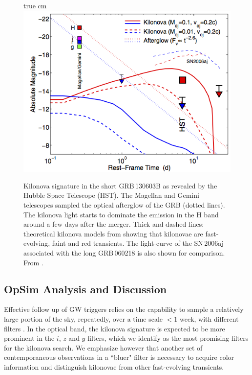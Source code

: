 \begin{figure}
 true cm
\centering
\includegraphics[scale=0.85]{figs/transients/kilonovaBerger.png}
\caption{Kilonova signature in the short GRB\,130603B as revealed by the
Hubble Space Telescope (HST). The Magellan and Gemini telescopes sampled
the optical afterglow of the GRB (dotted lines). The kilonova light
starts to dominate the emission in the H band around a few days after
the merger. Thick and dashed lines: theoretical kilonova models from
\citet{Barnes13} showing that kilonovae are fast-evolving, faint and red
transients. The light-curve of the SN\,2006aj associated with the long
GRB\,060218  is also shown for comparison. From \citet{Berger13}.}
\label{Fig:kilonova}
\end{figure}



\subsection{OpSim Analysis and Discussion}
\label{sec:\secname:analysis}

Effective follow up of GW triggers relies on the capability to sample a
relatively large portion of the sky, repeatedly, over a time scale $<1$
week, with different filters \citep{Cowperthwaite15}. In the optical
band, the kilonova signature is expected to be more prominent in the
$i$, $z$  and $y$ filters, which we identify as the most promising
filters for the kilonova search. We emphasize however that another set
of contemporaneous observations in  a ``bluer" filter is necessary to
acquire color information and distinguish kilonovae from other
fast-evolving transients.

